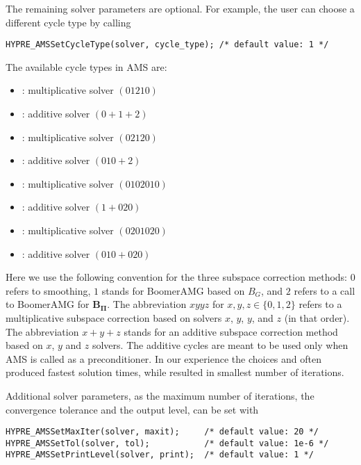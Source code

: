The remaining solver parameters are optional.
For example, the user can choose a different cycle type by calling
\begin{display}\begin{verbatim}
HYPRE_AMSSetCycleType(solver, cycle_type); /* default value: 1 */
\end{verbatim}\end{display}

\noindent
The available cycle types in AMS are:
\begin{itemize}
\item {}: multiplicative solver $(01210)$
\item {}: additive solver $(0+1+2)$
\item {}: multiplicative solver $(02120)$
\item {}: additive solver $(010+2)$
\item {}: multiplicative solver $(0102010)$
\item {}: additive solver $(1+020)$
\item {}: multiplicative solver $(0201020)$
\item {}: additive solver $(010+020)$
\end{itemize}
Here we use the following convention for the
three subspace correction methods:
$0$ refers to smoothing, $1$ stands for BoomerAMG based on $B_G$, and
$2$ refers to a call to BoomerAMG for ${\mathbf B}_{{\mathbf \Pi}}$.
The abbreviation $xyyz$  for $x,y,z \in \{0,1,2\}$
refers to a multiplicative subspace correction based on solvers $x$, $y$, $y$, and $z$ (in that order).
The abbreviation $x+y+z$ stands for an additive subspace correction method
based on $x$, $y$ and $z$ solvers.
The additive cycles are meant to be used only when AMS is called
as a preconditioner.
In our experience the choices  and  often produced
fastest solution times, while  resulted in smallest
number of iterations.

Additional solver parameters, as the maximum number of iterations,
the convergence tolerance and the output level, can be set with
\begin{display}\begin{verbatim}
HYPRE_AMSSetMaxIter(solver, maxit);     /* default value: 20 */
HYPRE_AMSSetTol(solver, tol);           /* default value: 1e-6 */
HYPRE_AMSSetPrintLevel(solver, print);  /* default value: 1 */
\end{verbatim}\end{display}

